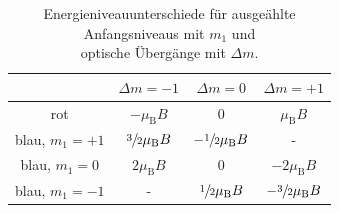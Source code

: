 \begin{table}[H]
    \centering
    \caption{Energieniveauunterschiede für ausgeählte Anfangsniveaus mit $m_1$ und\\ optische Übergänge mit $\Delta m$.}
    \vspace{-5pt}
    \label{tab:ueber}
    \begin{tabular}{c|ccc}
         & $\Delta m = -1$ & $\Delta m = 0$ & $\Delta m = +1$ \\
        \hline
        rot                 & $-\mu_\text{B}B$              & 0                             & $\mu_\text{B}B$               \\
        blau, $m_1 = +1$    & $\sfrac{3}{2} \mu_\text{B}B$  & $-\sfrac{1}{2}\mu_\text{B}B$  & -                             \\
        blau, $m_1 = 0$     & $2\mu_\text{B}B$              & 0                             & $-2\mu_\text{B}B$             \\ 
        blau, $m_1 = -1$    & -                             & $\sfrac{1}{2}\mu_\text{B}B$   & $-\sfrac{3}{2}\mu_\text{B}B$  \\
    \end{tabular}
\end{table}


